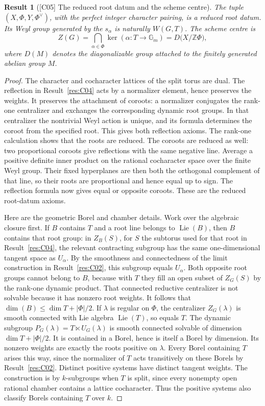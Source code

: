 \documentclass[11pt,a4paper,openany,oneside]{book}
\theoremstyle{resultstyle}
\newtheorem{statement}{Result}[chapter]
\newenvironment{result}[2]{\clubpenalty=10000\begin{statement}[\textnormal{[#1]} #2]\leavevmode\label{res:#1}\ignorespaces}{\end{statement}}
\theoremstyle{definition}
\numberwithin{equation}{chapter}
\newcommand{\Gm}{\mathbb{G}_m}
\DeclareMathOperator{\Lie}{Lie}
\newcommand{\ZZ}{\mathbb{Z}}
\begin{document}
\begin{result}{C05}{The reduced root datum and the scheme centre}
The tuple \((X,\Phi,Y,\Phi^\vee)\), with the perfect integer character pairing, is a reduced root datum. Its Weyl group generated by the \(s_\alpha\) is naturally \(W(G,T)\). The scheme centre is
\[
 Z(G)=\bigcap_{\alpha\in\Phi}\ker(\alpha:T\to\Gm)
      =D\bigl(X/\ZZ\Phi\bigr),
\]
where \(D(M)\) denotes the diagonalizable group attached to the finitely generated abelian group \(M\).
\end{result}

\begin{proof}
The character and cocharacter lattices of the split torus are
dual. The reflection in Result~\ref{res:C04} acts by a
normalizer element, hence preserves the weights. It preserves
the attachment of coroots: a normalizer conjugates the rank-one
centralizer and exchanges the corresponding dynamic root groups.
In that centralizer the nontrivial Weyl action is unique, and its
formula determines the coroot from the specified root.
This gives both reflection axioms. The rank-one calculation shows
that the roots are reduced. The coroots are reduced as well:
two proportional coroots give reflections with the same negative
line. Average a positive definite inner product on the rational
cocharacter space over the finite Weyl group. Their fixed hyperplanes
are then both the orthogonal complement of that line, so their
roots are proportional and hence equal up to sign. The reflection
formula now gives equal or opposite coroots. These are the
reduced root-datum axioms.

Here are the geometric Borel and chamber details. Work over the
algebraic closure first. If \(B\) contains \(T\) and a root line
belongs to \(\Lie(B)\), then \(B\) contains that root group:
in \(Z_B(S)\), for \(S\) the subtorus used for that root in
Result~\ref{res:C04}, the relevant contracting subgroup has
the same one-dimensional tangent space as \(U_\alpha\).
By the smoothness and connectedness of the limit construction
in Result~\ref{res:C02}, this subgroup equals \(U_\alpha\).
Both opposite root groups cannot belong to \(B\), because
with \(T\) they fill an open subset of \(Z_G(S)\) by
the rank-one dynamic product. That connected reductive
centralizer is not solvable because it has nonzero root weights.
It follows that
\(\dim(B)\le\dim T+|\Phi|/2\).
If \(\lambda\) is regular on \(\Phi\), the centralizer
\(Z_G(\lambda)\) is smooth connected with Lie algebra
\(\Lie(T)\), so equals \(T\).
The dynamic subgroup \(P_G(\lambda)=T\ltimes U_G(\lambda)\)
is smooth connected solvable of dimension
\(\dim T+|\Phi|/2\).
It is contained in a Borel, hence is itself a Borel by
dimension. Its nonzero weights are exactly the roots positive
on \(\lambda\). Every Borel containing \(T\) arises this way,
since the normalizer of \(T\) acts transitively on these Borels
by Result~\ref{res:C02}. Distinct positive systems have distinct
tangent weights. The construction is by \(k\)-subgroups when
\(T\) is split, since every nonempty open rational chamber
contains a lattice cocharacter. Thus the positive systems
also classify Borels containing \(T\) over \(k\).


\end{proof}
\end{document}
